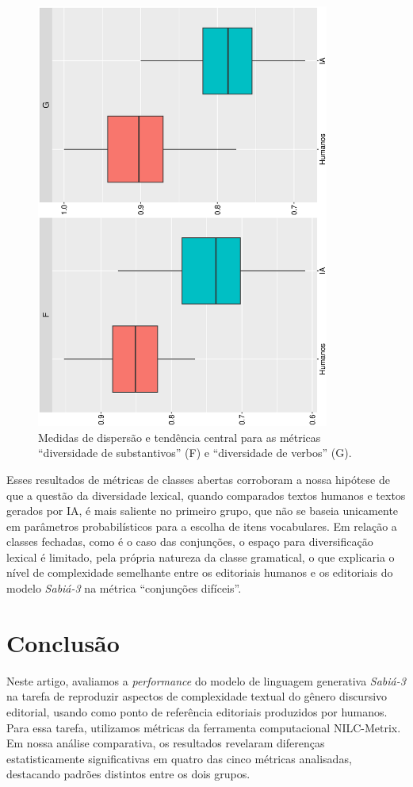\documentclass[portuguese]{textolivre}
\begin{document}
\begin{figure}[htbp]
\centering
\begin{minipage}{1\textwidth}
\centering
  \includegraphics[width=.5\linewidth, height=14cm, angle=270]{figura_02.ps}
 \caption{Medidas de dispersão e tendência central para as métricas ``diversidade de substantivos'' (F) e ``diversidade de verbos'' (G).}
 \label{fig-img-02}
\end{minipage}
\end{figure}

Esses resultados de métricas de classes abertas corroboram a nossa hipótese de que a questão da diversidade lexical, quando comparados textos humanos e textos gerados por IA, é mais saliente no primeiro grupo, que não se baseia unicamente em parâmetros probabilísticos para a escolha de itens vocabulares.
Em relação a classes fechadas, como é o caso das conjunções, o espaço para diversificação lexical é limitado, pela própria natureza da classe gramatical, o que explicaria o nível de complexidade semelhante entre os editoriais humanos e os editoriais do modelo \emph{Sabiá-3} na métrica ``conjunções difíceis''.

\section{Conclusão}\label{sec-conclusão}
Neste artigo, avaliamos a \emph{performance} do modelo de linguagem generativa \emph{Sabiá-3} na tarefa de reproduzir aspectos de complexidade textual do gênero discursivo editorial, usando como ponto de referência editoriais produzidos por humanos.
Para essa tarefa, utilizamos métricas da ferramenta computacional NILC-Metrix.
Em nossa análise comparativa, os resultados revelaram diferenças estatisticamente significativas em quatro das cinco métricas analisadas, destacando padrões distintos entre os dois grupos.
\end{document}
